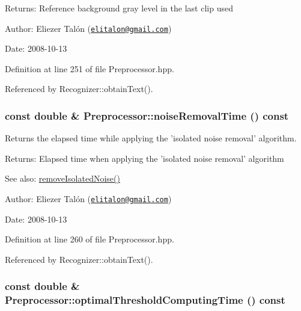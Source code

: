 \begin{Desc}
\item[Returns:]Reference background gray level in the last clip used\end{Desc}
\begin{Desc}
\item[Author:]Eliezer Talón (\href{mailto:elitalon@gmail.com}{\tt elitalon@gmail.com}) \end{Desc}
\begin{Desc}
\item[Date:]2008-10-13 \end{Desc}


Definition at line 251 of file Preprocessor.hpp.

Referenced by Recognizer::obtainText().\hypertarget{class_preprocessor_e54e2a5703a0f39ddff8e9936f9a2275}{
\subsubsection[noiseRemovalTime]{\setlength{\rightskip}{0pt plus 5cm}const double \& Preprocessor::noiseRemovalTime () const}}
\label{class_preprocessor_e54e2a5703a0f39ddff8e9936f9a2275}


Returns the elapsed time while applying the 'isolated noise removal' algorithm. 

\begin{Desc}
\item[Returns:]Elapsed time when applying the 'isolated noise removal' algorithm\end{Desc}
\begin{Desc}
\item[See also:]\hyperlink{class_preprocessor_a3e047486a0a80f2103f51d7141e41c5}{removeIsolatedNoise()}\end{Desc}
\begin{Desc}
\item[Author:]Eliezer Talón (\href{mailto:elitalon@gmail.com}{\tt elitalon@gmail.com}) \end{Desc}
\begin{Desc}
\item[Date:]2008-10-13 \end{Desc}


Definition at line 260 of file Preprocessor.hpp.

Referenced by Recognizer::obtainText().\hypertarget{class_preprocessor_2bd63a7e7aba300ddf79b2c956e943e9}{
\subsubsection[optimalThresholdComputingTime]{\setlength{\rightskip}{0pt plus 5cm}const double \& Preprocessor::optimalThresholdComputingTime () const}}
\label{class_preprocessor_2bd63a7e7aba300ddf79b2c956e943e9}


